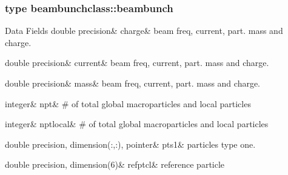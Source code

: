 \subsubsection{type beambunchclass\+::beambunch}
\begin{DoxyFields}{Data Fields}
\mbox{\label{namespacebeambunchclass_a555bb0dc53871a3f69755125598c8938}} 
double precision&
charge&
beam freq, current, part. mass and charge. \\
\hline

\mbox{\label{namespacebeambunchclass_a0611d8fb67f60eb1ea7a3df79c5de915}} 
double precision&
current&
beam freq, current, part. mass and charge. \\
\hline

\mbox{\label{namespacebeambunchclass_abeaad3b1ce823a9c49cab5a8b96f5ff0}} 
double precision&
mass&
beam freq, current, part. mass and charge. \\
\hline

\mbox{\label{namespacebeambunchclass_a20f5303645e1b7fa0cbfa88f81cda947}} 
integer&
npt&
\# of total global macroparticles and local particles \\
\hline

\mbox{\label{namespacebeambunchclass_a71a8687235fdc19d862fb13092b714a3}} 
integer&
nptlocal&
\# of total global macroparticles and local particles \\
\hline

\mbox{\label{namespacebeambunchclass_af0d19c1e3e537ade010af8554783c8d7}} 
double precision, dimension(:,:), pointer&
pts1&
particles type one. \\
\hline

\mbox{\label{namespacebeambunchclass_a973e0e4ee1b24185bac1d727d2c074f5}} 
double precision, dimension(6)&
refptcl&
reference particle \\
\hline

\end{DoxyFields}
